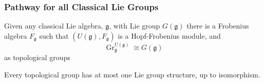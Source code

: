 \documentclass{beamer}
\begin{document}
%
%
%
%
%
%
%
%
%
%
%
%
%
%
%



\begin{frame}
\frametitle{Pathway for all Classical Lie Groups}


\begin{prop*}{}
Given any classical Lie algebra, $\mathfrak{g}$, with Lie group $G(\mathfrak{g})$ there is a Frobenius algebra $F_{\mathfrak{g}}$ such that $(U(\mathfrak{g}), F_{\mathfrak{g}})$ is a Hopf-Frobenius module, and 
\begin{equation*}
\operatorname{Gr}_{\mathfrak{g}}^{U(\mathfrak{g})} \cong G(\mathfrak{g})
\end{equation*}
as topological groups
\end{prop*}

 Every topological group has at most one Lie group structure, up to isomorphism.


\end{frame}
\end{document}
